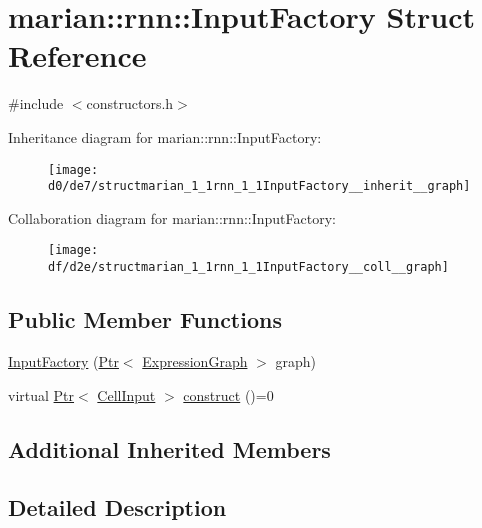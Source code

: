 \hypertarget{structmarian_1_1rnn_1_1InputFactory}{}\section{marian\+:\+:rnn\+:\+:Input\+Factory Struct Reference}
\label{structmarian_1_1rnn_1_1InputFactory}


{\ttfamily \#include $<$constructors.\+h$>$}



Inheritance diagram for marian\+:\+:rnn\+:\+:Input\+Factory\+:
\nopagebreak
\begin{figure}[H]
\begin{center}
\leavevmode
\texttt{[image: d0/de7/structmarian\_1\_1rnn\_1\_1InputFactory\_\_inherit\_\_graph]}
\end{center}
\end{figure}


Collaboration diagram for marian\+:\+:rnn\+:\+:Input\+Factory\+:
\nopagebreak
\begin{figure}[H]
\begin{center}
\leavevmode
\texttt{[image: df/d2e/structmarian\_1\_1rnn\_1\_1InputFactory\_\_coll\_\_graph]}
\end{center}
\end{figure}
\subsection*{Public Member Functions}
\begin{DoxyCompactItemize}
\item 
\hyperlink{structmarian_1_1rnn_1_1InputFactory_a27fda3c2dfb71c9922ffa8b9fda38dad}{Input\+Factory} (\hyperlink{namespacemarian_ad1a373be43a00ef9ce35666145137b08}{Ptr}$<$ \hyperlink{classmarian_1_1ExpressionGraph}{Expression\+Graph} $>$ graph)
\item 
virtual \hyperlink{namespacemarian_ad1a373be43a00ef9ce35666145137b08}{Ptr}$<$ \hyperlink{classmarian_1_1rnn_1_1CellInput}{Cell\+Input} $>$ \hyperlink{structmarian_1_1rnn_1_1InputFactory_a0b02c7e1c29d2cd7decc4d5d2c577621}{construct} ()=0
\end{DoxyCompactItemize}
\subsection*{Additional Inherited Members}


\subsection{Detailed Description}


